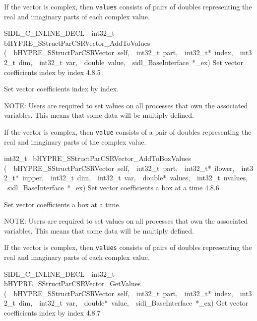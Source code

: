 \documentclass{article}
\begin{document}
\begin{cxxentry}
\begin{cxxentry}
\begin{cxxfunction}
\begin{cxxdoc}
If the vector is complex, then {\tt values} consists of pairs
of doubles representing the real and imaginary parts of each
complex value.
\end{cxxdoc}
\end{cxxfunction}
\begin{cxxfunction}
{SIDL\_C\_INLINE\_DECL\ \ int32\_t\ }
        {bHYPRE\_SStructParCSRVector\_AddToValues}
        {(\ \ bHYPRE\_SStructParCSRVector\ self,\ \ int32\_t\ part,\ \ int32\_t*\ index,\ \ int32\_t\ dim,\ \ int32\_t\ var,\ \ double\ value,\ \ sidl\_BaseInterface\ *\_ex)}
        {
Set vector coefficients index by index}
        {4.8.5}
\begin{cxxdoc}

Set vector coefficients index by index.

NOTE: Users are required to set values on all processes that
own the associated variables.  This means that some data will
be multiply defined.

If the vector is complex, then {\tt value} consists of a pair
of doubles representing the real and imaginary parts of the
complex value.
\end{cxxdoc}
\end{cxxfunction}
\begin{cxxfunction}
{int32\_t\ }
        {bHYPRE\_SStructParCSRVector\_AddToBoxValues}
        {(\ \ bHYPRE\_SStructParCSRVector\ self,\ \ int32\_t\ part,\ \ int32\_t*\ ilower,\ \ int32\_t*\ iupper,\ \ int32\_t\ dim,\ \ int32\_t\ var,\ \ double*\ values,\ \ int32\_t\ nvalues,\ \ sidl\_BaseInterface\ *\_ex)}
        {
Set vector coefficients a box at a time}
        {4.8.6}
\begin{cxxdoc}

Set vector coefficients a box at a time.

NOTE: Users are required to set values on all processes that
own the associated variables.  This means that some data will
be multiply defined.

If the vector is complex, then {\tt values} consists of pairs
of doubles representing the real and imaginary parts of each
complex value.
\end{cxxdoc}
\end{cxxfunction}
\begin{cxxfunction}
{SIDL\_C\_INLINE\_DECL\ \ int32\_t\ }
        {bHYPRE\_SStructParCSRVector\_GetValues}
        {(\ \ bHYPRE\_SStructParCSRVector\ self,\ \ int32\_t\ part,\ \ int32\_t*\ index,\ \ int32\_t\ dim,\ \ int32\_t\ var,\ \ double*\ value,\ \ sidl\_BaseInterface\ *\_ex)}
        {
Get vector coefficients index by index}
        {4.8.7}
\begin{cxxdoc}


\end{cxxdoc}
\end{cxxfunction}
\end{cxxentry}
\end{cxxentry}
\end{document}
